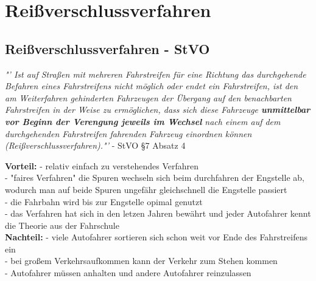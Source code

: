 \chapter{Reißverschlussverfahren}
\section{Reißverschlussverfahren - StVO}
\begin{center}
	\textit{"' Ist auf Straßen mit mehreren Fahrstreifen für eine Richtung das durchgehende Befahren eines Fahrstreifens nicht möglich oder endet ein Fahrstreifen, ist den am Weiterfahren gehinderten Fahrzeugen der Übergang auf den benachbarten Fahrstreifen in der Weise zu ermöglichen, dass sich diese Fahrzeuge \textbf{unmittelbar vor Beginn der Verengung jeweils im Wechsel} nach einem auf dem durchgehenden Fahrstreifen fahrenden Fahrzeug einordnen können (Reißverschlussverfahren)."'} - StVO \S 7 Absatz 4
\end{center}
\textbf{Vorteil:} - relativ einfach zu verstehendes Verfahren\\
- "faires Verfahren" die Spuren wechseln sich beim durchfahren der Engstelle ab, wodurch man auf beide Spuren ungefähr gleichschnell die Engstelle passiert\\
- die Fahrbahn wird bis zur Engstelle opimal genutzt\\
- das Verfahren hat sich in den letzen Jahren bewährt und jeder Autofahrer kennt die Theorie aus der Fahrschule\\
\textbf{Nachteil:} - viele Autofahrer sortieren sich schon weit vor Ende des Fahrstreifens ein\\
- bei großem Verkehrsaufkommen kann der Verkehr zum Stehen kommen\\
- Autofahrer müssen anhalten und andere Autofahrer reinzulassen\\

